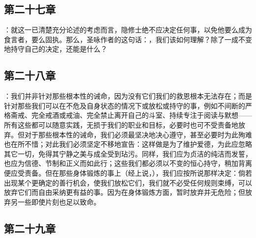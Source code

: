 
\subsection{第二十七章}

\par

：就这一已清楚充分论述的考虑而言，隐修士绝不应决定任何事，以免他要么成为食言者，要么固执。那么，圣咏作者的这句话：，我们该如何理解？除了一成不变地持守自己的决定，还能是什么？\par


\subsection{第二十八章}

\par

：我们并非针对那些根本性的诫命，因为没有它们我们的救恩根本无法存在；而是针对那些我们可以在不危及自身状态的情况下或放松或持守的事，例如不间断的严格斋戒、完全戒酒或戒油、完全禁止离开自己的斗室、持续专注于阅读与默想——所有这些都可以随意实践，无损于我们的职业和目标，必要时也可不受责备地放弃。但对于那些根本性的诫命，我们必须最坚决地决心遵守，甚至必要时为此殉难也在所不惜；对此我们必须坚定不移地宣告：这样做是为了维护爱德，为此应忽略其它一切，免得其宁静之美与成全受到玷污。同样，我们应为贞洁的纯洁而发誓，也应为信德、节制和正义而如此行；这些我们都必须以不变的恒心持守，稍加背离便应受责备。但在那些身体锻炼的事上（经上说，），我们应按所说那样决定：倘若出现某个更确定的善行机会，使我们放松它们，我们就不必受任何规则束缚，可以放弃它们而自由采纳更有益的事。因为在身体锻炼方面，暂时放弃并无危险；但放弃另一些即使片刻也足以致命。\par


\subsection{第二十九章}

